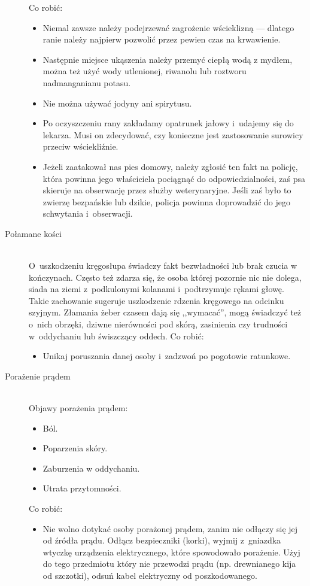 \documentclass[a5paper,10pt,titlepage,twoside]{article}
\begin{document}
\begin{description}
Co robić:
\begin{itemize}
\item Niemal zawsze należy podejrzewać zagrożenie wścieklizną --- dlatego ranie należy najpierw pozwolić przez pewien czas na krwawienie.
\item Następnie miejsce ukąszenia należy przemyć ciepłą wodą z mydłem, można też użyć wody utlenionej, riwanolu lub roztworu nadmanganianu potasu.
\item Nie można używać jodyny ani spirytusu.
\item Po oczyszczeniu rany zakładamy opatrunek jałowy i~udajemy się do lekarza. Musi on zdecydować, czy konieczne jest zastosowanie surowicy przeciw wściekliźnie.
\item Jeżeli zaatakował nas pies domowy, należy zgłosić ten fakt na policję, która powinna jego właściciela pociągnąć do odpowiedzialności, zaś psa skieruje na obserwację przez służby weterynaryjne. Jeśli zaś było to zwierzę bezpańskie lub dzikie, policja powinna doprowadzić do jego schwytania i~obserwacji.
\end{itemize}
\item[Połamane kości] \hfill \\ O~uszkodzeniu kręgosłupa świadczy fakt bezwładności lub brak czucia w kończynach. Często też zdarza się, że osoba której pozornie nic nie dolega, siada na ziemi z~podkulonymi kolanami i~podtrzymuje rękami głowę. Takie zachowanie sugeruje uszkodzenie rdzenia kręgowego na odcinku szyjnym. Złamania żeber czasem dają się ,,wymacać'', mogą świadczyć też o~nich obrzęki, dziwne nierówności pod skórą, zasinienia czy trudności w~oddychaniu lub świszczący oddech.
\newpage
Co robić:
\begin{itemize}
\item Unikaj poruszania danej osoby i~zadzwoń po pogotowie ratunkowe.
\end{itemize}
\item[Porażenie prądem] \hfill \\ Objawy porażenia prądem:
\begin{itemize}
\item Ból.
\item Poparzenia skóry.
\item Zaburzenia w oddychaniu.
\item Utrata przytomności.
\end{itemize}
Co robić:
\begin{itemize}
\item Nie wolno dotykać osoby porażonej prądem, zanim nie odłączy się jej od źródła prądu. Odłącz bezpieczniki (korki), wyjmij z~gniazdka wtyczkę urządzenia elektrycznego, które spowodowało porażenie. Użyj do tego przedmiotu który nie przewodzi prądu (np. drewnianego kija od szczotki), odsuń kabel elektryczny od poszkodowanego.

\end{itemize}
\end{description}
\end{document}
